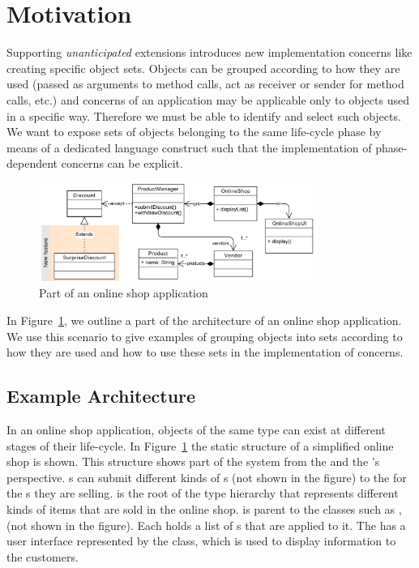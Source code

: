 \section{Motivation}
\label{sect:motivation}
Supporting \emph{unanticipated} extensions introduces new implementation concerns like creating specific object sets.
Objects can be grouped according to how they are used (passed as arguments to method calls, act as receiver or sender for method calls, etc.) and concerns of an application may be applicable only to objects used in a specific way.
Therefore we must be able to identify and select such objects.
We want to expose sets of objects belonging to the same life-cycle phase by means of a dedicated language construct such that the implementation of phase-dependent concerns can be explicit.

\begin{figure}
\centering
\includegraphics[width=0.8\textwidth]{images/onlineshopextended.pdf}%
\vspace{10pt}
\caption{Part of an online shop application}%
\label{fig:shop}%
\end{figure}

In Figure~\ref{fig:shop}, we outline a part of the architecture of an online shop application. We use this scenario to give examples of grouping objects into sets according to how they are used and how to use these sets in the implementation of concerns.

\subsection{Example Architecture}
In an online shop application, objects of the same type can exist at different stages of their life-cycle. In Figure~\ref{fig:shop} the static structure of a simplified online shop is shown. This structure shows part of the system from the  and the 's perspective. s can submit different kinds of s (not shown in the figure) to the  for the s they are selling.  is the root of the type hierarchy that represents different kinds of items that are sold in the online shop.  is parent to the classes such as ,  (not shown in the figure). Each  holds a list of s that are applied to it. The  has a user interface represented by the  class, which is used to display information to the customers.


